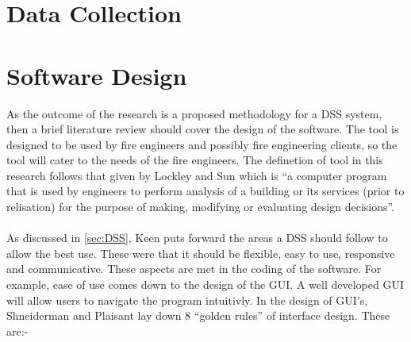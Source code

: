 \documentclass[table,a4paper,oneside]{book}
\begin{document}
\section{Data Collection}
\label{sec:Data_Collection}

\section{Software Design}
\label{sec:Software_Design}
As the outcome of the research is a proposed methodology for a \ac{DSS} system, then a brief literature review should cover the design of the software. The tool is designed to be used by fire engineers and possibly fire engineering clients, so the tool will cater to the needs of the fire engineers. The definetion of tool in this research follows that given by Lockley and Sun \citep{Lockley1995} which is ``a computer program that is used by engineers to perform analysis of a building or its services (prior to relisation) for the purpose of making, modifying or evaluating design decisions''.
\\
\\
As discussed in \ref{sec:DSS}, Keen puts forward the areas a \ac{DSS} should follow to allow the best use. These were that it should be flexible, easy to use, responsive and communicative. These aspects are met in the coding of the software. For example, ease of use comes down to the design of the \ac{GUI}. A well developed \ac{GUI} will allow users to navigate the program intuitivly. In the design of \ac{GUI}'s, Shneiderman and Plaisant lay down 8 ``golden rules'' of interface design. These are:-
\end{document}

